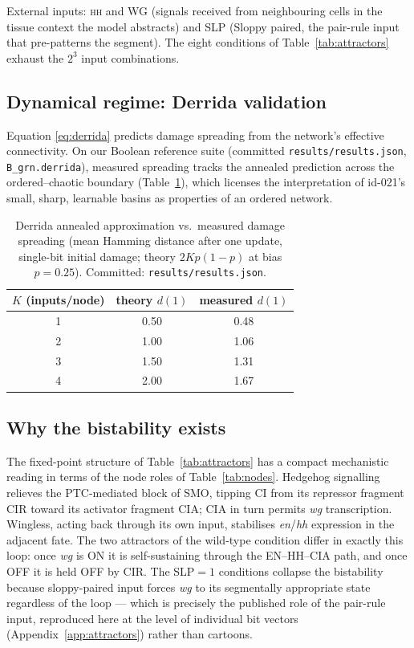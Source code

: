 External inputs: \textsc{hh} and \textsc{WG} (signals received from
neighbouring cells in the tissue context the model abstracts) and
\textsc{SLP} (Sloppy paired, the pair-rule input that pre-patterns the
segment). The eight conditions of Table~\ref{tab:attractors} exhaust the
$2^3$ input combinations.

\subsection{Dynamical regime: Derrida validation}

Equation \eqref{eq:derrida} predicts damage spreading from the network's
effective connectivity. On our Boolean reference suite (committed
\texttt{results/results.json}, \texttt{B\_grn.derrida}), measured spreading
tracks the annealed prediction across the ordered--chaotic boundary
(Table~\ref{tab:derrida}), which licenses the interpretation of id-021's
small, sharp, learnable basins as properties of an ordered network.

\begin{table}[!htbp]
\centering
\caption{Derrida annealed approximation vs.\ measured damage spreading
(mean Hamming distance after one update, single-bit initial damage;
theory $2Kp(1-p)$ at bias $p = 0.25$). Committed:
\texttt{results/results.json}.}
\label{tab:derrida}
\begin{tabular}{ccc}
\toprule
$K$ (inputs/node) & theory $d(1)$ & measured $d(1)$ \\
\midrule
1 & 0.50 & 0.48 \\
2 & 1.00 & 1.06 \\
3 & 1.50 & 1.31 \\
4 & 2.00 & 1.67 \\
\bottomrule
\end{tabular}
\end{table}

\subsection{Why the bistability exists}

The fixed-point structure of Table~\ref{tab:attractors} has a compact
mechanistic reading in terms of the node roles of Table~\ref{tab:nodes}.
Hedgehog signalling relieves the PTC-mediated block of SMO, tipping CI from
its repressor fragment CIR toward its activator fragment CIA; CIA in turn
permits \emph{wg} transcription. Wingless, acting back through its own
input, stabilises \emph{en}/\emph{hh} expression in the adjacent fate. The
two attractors of the wild-type condition differ in exactly this loop: once
\emph{wg} is ON it is self-sustaining through the EN--HH--CIA path, and once
OFF it is held OFF by CIR. The \textsc{SLP}$=1$ conditions collapse the
bistability because sloppy-paired input forces \emph{wg} to its
segmentally appropriate state regardless of the loop --- which is precisely
the published role of the pair-rule input, reproduced here at the level of
individual bit vectors (Appendix~\ref{app:attractors}) rather than cartoons.

